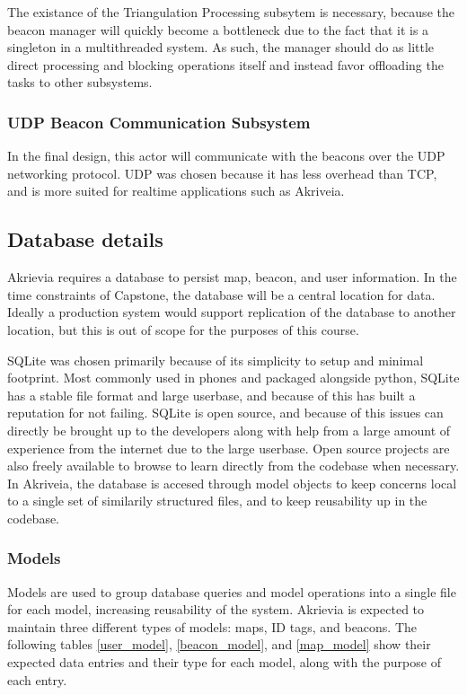 The existance of the Triangulation Processing subsytem is necessary, because the beacon manager will quickly become a bottleneck due to the fact that it is a singleton in a multithreaded system.
As such, the manager should do as little direct processing and blocking operations itself and instead favor offloading the tasks to other subsystems.

\bigskip
\subsubsection{UDP Beacon Communication Subsystem}
In the final design, this actor will communicate with the beacons over the UDP networking protocol.
UDP was chosen because it has less overhead than TCP, and is more suited for realtime applications such as Akriveia.

\bigskip
\subsection{Database details}
Akrievia requires a database to persist map, beacon, and user information.
In the time constraints of Capstone, the database will be a central location for data.
Ideally a production system would support replication of the database to another location, but this is out of scope for the purposes of this course.

\bigskip
SQLite was chosen primarily because of its simplicity to setup and minimal footprint.
Most commonly used in phones and packaged alongside python, SQLite has a stable file format and large userbase, and because of this has built a reputation for not failing.
SQLite is open source, and because of this issues can directly be brought up to the developers along with help from a large amount of experience from the internet due to the large userbase.
Open source projects are also freely available to browse to learn directly from the codebase when necessary.
In Akriveia, the database is accesed through model objects to keep concerns local to a single set of similarily structured files, and to keep reusability up in the codebase.

\bigskip
\subsubsection{Models}
Models are used to group database queries and model operations into a single file for each model, increasing reusability of the system.
Akrievia is expected to maintain three different types of models: maps, ID tags, and beacons.
The following tables \ref{user_model}, \ref{beacon_model}, and \ref{map_model} show their expected data entries and their type for each model, along with the purpose of each entry.

